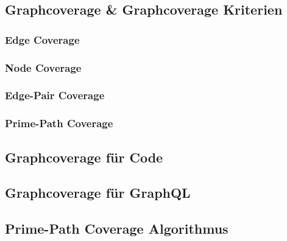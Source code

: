 \subsection{Graphcoverage & Graphcoverage Kriterien}

\subsubsection{Edge Coverage}

\subsubsection{Node Coverage}

\subsubsection{Edge-Pair Coverage}

\subsubsection{Prime-Path Coverage}

\subsection{Graphcoverage für Code}

\subsection{Graphcoverage für GraphQL}

\subsection{Prime-Path Coverage Algorithmus}


